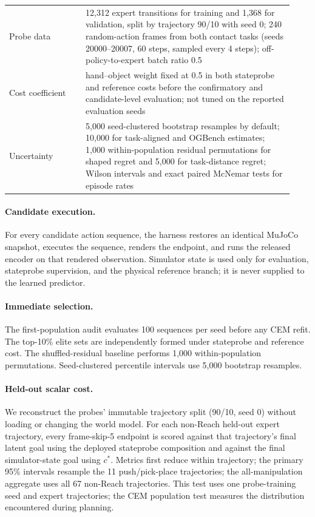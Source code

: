 \documentclass[10pt]{article}
\begin{document}
\begin{table}[ht]
\begin{tabular}{p{0.25\linewidth}p{0.68\linewidth}}
Probe data & 12,312 expert transitions for training and 1,368 for validation,
split by trajectory 90/10 with seed 0; 240 random-action frames from both
contact tasks (seeds 20000--20007, 60 steps, sampled every 4 steps);
off-policy-to-expert batch ratio 0.5 \\
Cost coefficient & hand--object weight fixed at 0.5 in both stateprobe and
reference costs before the confirmatory and candidate-level evaluation; not tuned
on the reported evaluation seeds \\
Uncertainty & 5,000 seed-clustered bootstrap resamples by default; 10,000 for
task-aligned and OGBench estimates; 1,000 within-population residual
permutations for shaped regret and 5,000 for task-distance regret; Wilson
intervals and exact paired McNemar tests for episode rates \\
\bottomrule
\end{tabular}
\end{table}

\paragraph{Candidate execution.}
For every candidate action sequence, the harness restores an identical MuJoCo
snapshot, executes the sequence, renders the endpoint, and runs the released
encoder on that rendered observation. Simulator state is used only for
evaluation, stateprobe supervision, and the physical reference branch; it is
never supplied to the learned predictor.

\paragraph{Immediate selection.}
The first-population audit evaluates 100 sequences per seed before any CEM
refit. The top-10\% elite sets are independently formed under stateprobe and
reference cost. The shuffled-residual baseline performs 1,000 within-population
permutations. Seed-clustered percentile intervals use 5,000 bootstrap
resamples.

\paragraph{Held-out scalar cost.}
We reconstruct the probes' immutable trajectory split (90/10, seed 0) without
loading or changing the world model. For each non-Reach held-out expert
trajectory, every frame-skip-5 endpoint is scored against that trajectory's
final latent goal using the deployed stateprobe composition and against the
final simulator-state goal using $c^*$. Metrics first reduce within trajectory;
the primary 95\% intervals resample the 11 push/pick-place trajectories; the
all-manipulation aggregate uses all 67 non-Reach trajectories. This test uses
one probe-training seed and expert trajectories; the CEM population test
measures the distribution encountered during planning.
\end{document}
